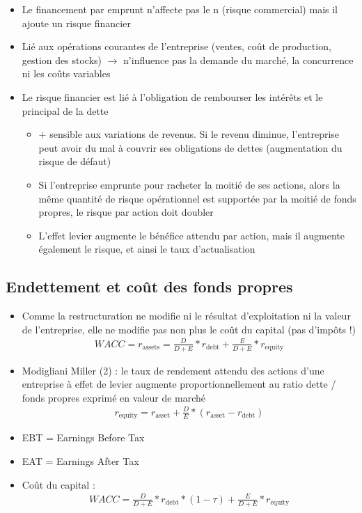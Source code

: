 \begin{itemize}
    \item Le financement par emprunt n'affecte pas le n (risque commercial) mais il ajoute un risque financier
    \item[\textgreen{$\rightarrow$}] Lié aux opérations courantes de l'entreprise (ventes, coût de production, gestion des stocks) $\rightarrow$ n'influence pas la demande du marché, la concurrence ni les coûts variables
    \item Le risque financier est lié à l'obligation de rembourser les intérêts et le principal de la dette
    \begin{itemize}
        \item + sensible aux variations de revenus. Si le revenu diminue, l'entreprise peut avoir du mal à couvrir ses obligations de dettes (augmentation du risque de défaut)
        \item Si l'entreprise emprunte pour racheter la moitié de ses actions, alors la même quantité de risque opérationnel est supportée par la moitié de fonds propres, le risque par action doit doubler
        \item L'effet levier augmente le bénéfice attendu par action, mais il augmente également le risque, et ainsi le taux d'actualisation
    \end{itemize}
\end{itemize}

\subsection{Endettement et coût des fonds propres}

\begin{itemize}
    \item Comme la restructuration ne modifie ni le résultat d'exploitation ni la valeur de l'entreprise, elle ne modifie pas non plus le coût du capital (pas d'impôts !)
    \begin{align*}
        WACC = r_{\text{assets}} = \frac{D}{D + E} * r_{\text{debt}} + \frac{E}{D + E} * r_{\text{equity}}
    \end{align*}
    \item Modigliani Miller (2) : le taux de rendement attendu des actions d'une entreprise à effet de levier augmente proportionnellement au ratio dette / fonds propres exprimé en valeur de marché
    \begin{align*}
        r_{\text{equity}} = r_{\text{asset}} + \frac{D}{E} * (r_{\text{asset}} - r_{\text{debt}})
    \end{align*}
    \item EBT = Earnings Before Tax
    \item EAT = Earnings After Tax
    \item Coût du capital :
    \begin{align*}
        WACC = \frac{D}{D + E} * r_{\text{debt}} * (1 - \tau) + \frac{E}{D + E} * r_{\text{equity}}
    \end{align*}
\end{itemize}

